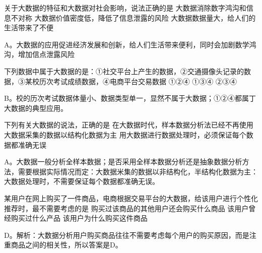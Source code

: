 \begin{groups}
\begin{questions}[rp]
\question
{}关于大数据的特征和大数据对社会影响，说法正确的是
{大数据消除数字鸿沟和信息不对称}
{大数据价值密度低，降低了信息泄露的风险}
{大数据数据量大，给人们的生活带来了不便}
\begin{solution}
A。大数据的应用促进经济发展和创新，给人们生活带来便利，同时会加剧数学鸿沟，增加信点泄露风险
\end{solution}

\question
{}下列数据中属于大数据的是：①社交平台上产生的数据，②交通摄像头记录的数据，③某校历次考试成绩数据，④电商平台交易数据
{①②④}
{①③④}
{②③④}
\begin{solution}
B。校的历次考试数据体量小、数据类型单一，显然不属于大数据；①②④都属丁大数据的典型应用。
\end{solution}

\question
{}下列有关大数据的说法，正确的是
{在大数据时代，样本数据分析法已经不再使用}
{大数据采集的数据以结构化数据为主}
{用大数据进行数据处理时，必须保证每个数据都准确无误}
\begin{solution}
A。大数据一般分析全样本数据；是否采用全样本数据分析还是抽象数据分析方法，需要根据实际情况而定：大数据米集的数据以非结构化，半结构化数据为主：大数据处理时，不需要保证每个数据都准确无误。
\end{solution}

\question
{}某用户在网上购买了一件商品，电商根据交易平台的大数据，给该用户进行个性化推荐时，最不需要考虑的是
{购买过该商品的其他用户还会购买什么商品}
{该用户曾经购买过什么产品}
{该用户为什么购买这件商品}
\begin{solution}
D。解析：大数据分析用户购买商品往往不需要考虑每个用户的购买原因，而是注重商品之间的相关性，所以答案是D。
\end{solution}









\end{questions}
\end{groups}
